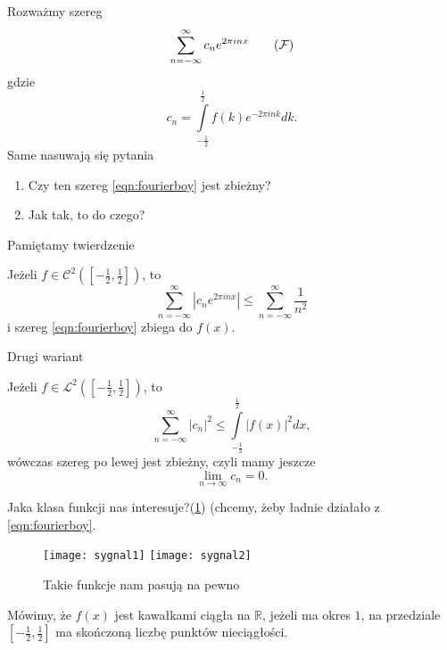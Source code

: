 \documentclass[../main.tex]{subfiles}
\begin{document}
    Rozważmy szereg
    \begin{equation}
        \label{eqn:fourierboy}
        \sum_{n=-\infty}^{\infty} c_n e^{2\pi i n x} \tag{$\mathcal{F}$}
    \end{equation}
gdzie
\[
    c_n = \int\limits_{-\frac{1}{2}}^{\frac{1}{2}} f(k) e^{-2\pi i n k}dk
.\]
Same nasuwają się pytania
\begin{enumerate}
    \item Czy ten szereg \eqref{eqn:fourierboy} jest zbieżny?
    \item Jak tak, to do czego?
\end{enumerate}

Pamiętamy twierdzenie
\begin{tw}
    Jeżeli $f\in\mathcal{C}^2\left(\left[-\frac{1}{2},\frac{1}{2}\right]\right)$, to
    \[
        \sum_{n=-\infty}^{\infty} \left| c_n e^{2\pi i n x} \right| \le \sum_{n=-\infty}^{\infty} \frac{1}{n^2}
    \]
    i szereg \eqref{eqn:fourierboy} zbiega do $f(x)$.
\end{tw}

Drugi wariant
\begin{tw}
    Jeżeli $f\in \mathcal{L}^2\left( \left[ -\frac{1}{2},\frac{1}{2} \right]  \right) $, to
    \[
        \sum_{n=-\infty}^{\infty} \left| c_n \right| ^2 \le \int\limits_{-\frac{1}{2}}^{\frac{1}{2}} \left| f(x) \right| ^2 dx
    ,\]
wówczas szereg po lewej jest zbieżny, czyli mamy jeszcze
\[
    \lim_{n \to \infty}c_n = 0
.\]
\end{tw}
\begin{pytanie}
    Jaka klasa funkcji nas interesuje?(\ref{fig:sygnal2}) (chcemy, żeby ładnie działało z \eqref{eqn:fourierboy}.
\end{pytanie}
\begin{figure}[h]
    \centering
    \texttt{[image: sygnal1]}
    \texttt{[image: sygnal2]}
    \caption{Takie funkcje nam pasują na pewno}
    \label{fig:sygnal2}
\end{figure}
\begin{definicja}
    Mówimy, że $f(x)$ jest kawałkami ciągła na $\mathbb{R}$, jeżeli ma okres $1$, na przedziale $\left[ -\frac{1}{2},\frac{1}{2} \right] $ ma skończoną liczbę punktów nieciągłości.
\end{definicja}
\end{document}
